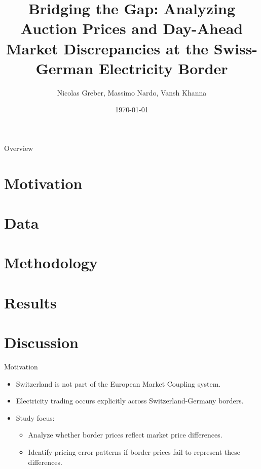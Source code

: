 \documentclass[aspectratio=169,xcolor=dvipsnames]{beamer}
\title[short title]{Bridging the Gap: Analyzing Auction Prices and Day-Ahead Market Discrepancies at the Swiss-German Electricity Border}
\author{Nicolas Greber, Massimo Nardo, Vansh Khanna}
\institute
{
    Department of Finance \\
    University of Zurich
    \vskip 3pt
}
\date{\today}
\begin{document}
\begin{frame}
    \titlepage
\end{frame}

\begin{frame}{Overview}
    \tableofcontents
    \section{Motivation}

\section{Data}

\section{Methodology}

\section{Results}

\section{Discussion}

\end{frame}

\begin{frame}{Motivation}

\begin{itemize}
    \item Switzerland is not part of the European Market Coupling system.
    \item Electricity trading occurs explicitly across Switzerland-Germany borders.
    \item Study focus:
    \begin{itemize}
        \item Analyze whether border prices reflect market price differences.
        \item Identify pricing error patterns if border prices fail to represent these differences.
    \end{itemize}
\end{itemize}

\end{frame}
\end{document}
